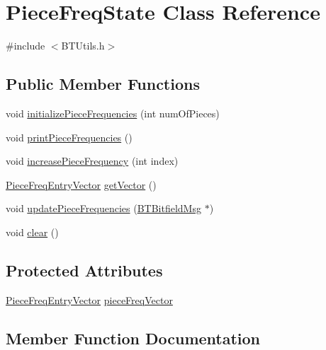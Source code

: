 \hypertarget{classPieceFreqState}{}\section{Piece\+Freq\+State Class Reference}
\label{classPieceFreqState}


{\ttfamily \#include $<$B\+T\+Utils.\+h$>$}

\subsection*{Public Member Functions}
\begin{DoxyCompactItemize}
\item 
void \hyperlink{classPieceFreqState_a945dd89d1b0df6767817d34b4d788955}{initialize\+Piece\+Frequencies} (int num\+Of\+Pieces)
\item 
void \hyperlink{classPieceFreqState_a711cdb21b1bd02659085f86fd58fc855}{print\+Piece\+Frequencies} ()
\item 
void \hyperlink{classPieceFreqState_a8abf2288dfad8b229dbd4eaa56025ee4}{increase\+Piece\+Frequency} (int index)
\item 
\hyperlink{BTUtils_8h_a93815334b34fe6744f67a8609bec0eaf}{Piece\+Freq\+Entry\+Vector} \hyperlink{classPieceFreqState_a9939e3c457da806a38ce7c7a4bc770a7}{get\+Vector} ()
\item 
void \hyperlink{classPieceFreqState_ac103a1963dfa2dec5b2c8a94297d6669}{update\+Piece\+Frequencies} (\hyperlink{classBTBitfieldMsg}{B\+T\+Bitfield\+Msg} $\ast$)
\item 
void \hyperlink{classPieceFreqState_ad735f08b52e580f2ab46fee92ff31211}{clear} ()
\end{DoxyCompactItemize}
\subsection*{Protected Attributes}
\begin{DoxyCompactItemize}
\item 
\hyperlink{BTUtils_8h_a93815334b34fe6744f67a8609bec0eaf}{Piece\+Freq\+Entry\+Vector} \hyperlink{classPieceFreqState_a14a8a32e47ebdc5e9522739e10cbfb28}{piece\+Freq\+Vector}
\end{DoxyCompactItemize}


\subsection{Member Function Documentation}
\hypertarget{classPieceFreqState_ad735f08b52e580f2ab46fee92ff31211}{}
